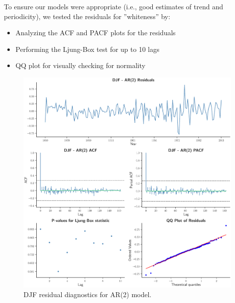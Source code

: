 \documentclass[12pt]{article}
\begin{document}
To ensure our models were appropriate (i.e., good estimates of  trend and periodicity), we tested the residuals for ”whiteness” by:
\begin{itemize}
\item Analyzing the ACF and PACF plots for the residuals
\item Performing the Ljung-Box test for up to 10 lags
\item QQ plot for visually checking for normality
\end{itemize}


\begin{figure}[H]
  \centering
  \includegraphics[width=1\textwidth,center]{figs/djf_res}
  \caption{DJF residual diagnostics for AR(2) model.}\label{djf_res}
\end{figure}
\end{document}
